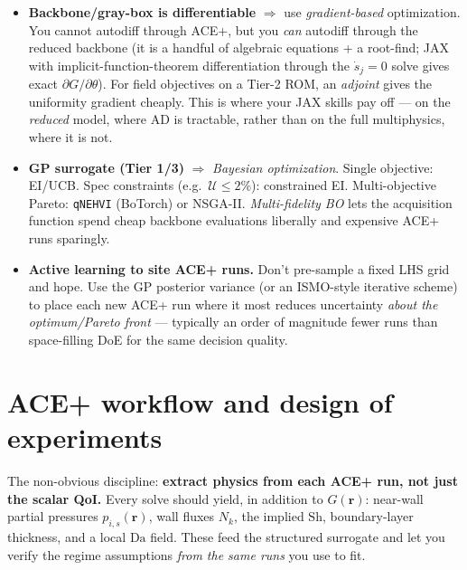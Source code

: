 \documentclass[11pt]{article}
\newcommand{\Da}{\mathrm{Da}}
\newcommand{\Sh}{\mathrm{Sh}}
\begin{document}
\begin{itemize}[leftmargin=1.4em,itemsep=3pt]
\item \textbf{Backbone/gray-box is differentiable} $\Rightarrow$ use \emph{gradient-based} optimization. You cannot autodiff through ACE+, but you \emph{can} autodiff through the reduced backbone (it is a handful of algebraic equations + a root-find; JAX with implicit-function-theorem differentiation through the $\dot s_j=0$ solve gives exact $\partial G/\partial\theta$). For field objectives on a Tier-2 ROM, an \emph{adjoint} gives the uniformity gradient cheaply. This is where your JAX skills pay off --- on the \emph{reduced} model, where AD is tractable, rather than on the full multiphysics, where it is not.
\item \textbf{GP surrogate (Tier 1/3)} $\Rightarrow$ \emph{Bayesian optimization}. Single objective: EI/UCB. Spec constraints (e.g.\ $\mathcal U\le 2\%$): constrained EI. Multi-objective Pareto: \texttt{qNEHVI} (BoTorch) or NSGA-II. \emph{Multi-fidelity BO} lets the acquisition function spend cheap backbone evaluations liberally and expensive ACE+ runs sparingly.
\item \textbf{Active learning to site ACE+ runs.} Don't pre-sample a fixed LHS grid and hope. Use the GP posterior variance (or an ISMO-style iterative scheme) to place each new ACE+ run where it most reduces uncertainty \emph{about the optimum/Pareto front} --- typically an order of magnitude fewer runs than space-filling DoE for the same decision quality.
\end{itemize}

\section{ACE+ workflow and design of experiments}
\label{sec:workflow}

The non-obvious discipline: \textbf{extract physics from each ACE+ run, not just the scalar QoI.} Every solve should yield, in addition to $G(\mathbf r)$: near-wall partial pressures $p_{i,s}(\mathbf r)$, wall fluxes $N_k$, the implied $\Sh$, boundary-layer thickness, and a local $\Da$ field. These feed the structured surrogate and let you verify the regime assumptions \emph{from the same runs} you use to fit.
\end{document}
